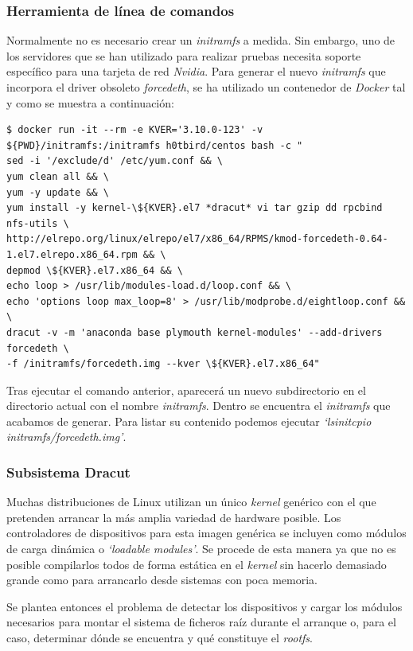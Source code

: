 \documentclass[a4paper,12pt,spanish,final]{epsc_tfc_pfc}
\begin{document}
\subsubsection{Herramienta de línea de comandos}
Normalmente no es necesario crear un \emph{initramfs} a medida. Sin embargo, uno de los servidores que se han utilizado para realizar pruebas necesita soporte específico para una tarjeta de red \emph{Nvidia}.
Para generar el nuevo \emph{initramfs} que incorpora el driver obsoleto \emph{forcedeth}, se ha utilizado un contenedor de \emph{Docker} tal y como se muestra a continuación:\\

\begin{lstlisting}[style=dnsmasq]
$ docker run -it --rm -e KVER='3.10.0-123' -v ${PWD}/initramfs:/initramfs h0tbird/centos bash -c "
sed -i '/exclude/d' /etc/yum.conf && \
yum clean all && \
yum -y update && \
yum install -y kernel-\${KVER}.el7 *dracut* vi tar gzip dd rpcbind nfs-utils \
http://elrepo.org/linux/elrepo/el7/x86_64/RPMS/kmod-forcedeth-0.64-1.el7.elrepo.x86_64.rpm && \
depmod \${KVER}.el7.x86_64 && \
echo loop > /usr/lib/modules-load.d/loop.conf && \
echo 'options loop max_loop=8' > /usr/lib/modprobe.d/eightloop.conf && \
dracut -v -m 'anaconda base plymouth kernel-modules' --add-drivers forcedeth \
-f /initramfs/forcedeth.img --kver \${KVER}.el7.x86_64"
\end{lstlisting}

Tras ejecutar el comando anterior, aparecerá un nuevo subdirectorio en el directorio actual con el nombre \emph{initramfs}. Dentro se encuentra el \emph{initramfs} que acabamos de generar. Para listar su contenido podemos ejecutar \emph{`lsinitcpio initramfs/forcedeth.img'}.

\subsubsection{Subsistema Dracut}
Muchas distribuciones de Linux utilizan un único \emph{kernel} genérico con el que pretenden arrancar la más amplia variedad de hardware posible.
Los controladores de dispositivos para esta imagen genérica se incluyen como módulos de carga dinámica o \emph{`loadable modules'}. Se procede de esta manera ya que no es posible compilarlos todos de forma estática en el \emph{kernel} sin hacerlo demasiado grande como para arrancarlo desde sistemas con poca memoria.

Se plantea entonces el problema de detectar los dispositivos y cargar los módulos necesarios para montar el sistema de ficheros raíz durante el arranque o, para el caso, determinar dónde se encuentra y qué constituye el \emph{rootfs}.
\end{document}
